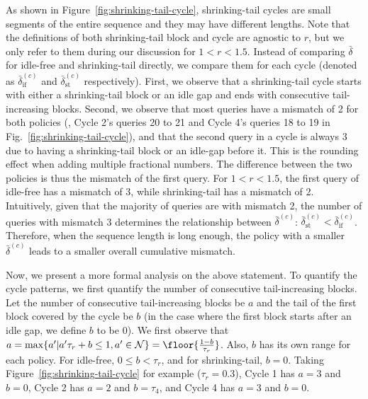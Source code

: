 As shown in Figure~\ref{fig:shrinking-tail-cycle}, shrinking-tail cycles are small segments of the entire sequence and they may have different lengths. Note that the definitions of both shrinking-tail block and cycle are agnostic to $r$, but we only refer to them during our discussion for $1 < r < 1.5$.
Instead of comparing $\bar{\delta}$ for idle-free and shrinking-tail directly,
we compare them for each cycle (denoted as $\bar{\delta}^{(c)}_{\text{if}}$ and $\bar{\delta}^{(c)}_{\text{st}}$ respectively). First, we observe that a shrinking-tail cycle starts with either a shrinking-tail block or an idle gap and ends with consecutive tail-increasing blocks. Second, we observe that most queries have a mismatch of 2 for both policies (\eg, Cycle 2's queries 20 to 21 and Cycle 4's queries 18 to 19 in Fig.~\ref{fig:shrinking-tail-cycle}), and that the second query in a cycle is always 3 due to having a shrinking-tail block or an idle-gap before it.  This is the rounding effect when adding multiple fractional numbers. The difference between the two policies is thus the mismatch of the first query. For $1 < r < 1.5$, the first query of idle-free has a mismatch of 3,
while shrinking-tail has a mismatch of 2. 
Intuitively, given that the majority of queries are with mismatch 2, the number of queries with mismatch 3 determines the relationship between $\bar{\delta}^{(c)}$: $\bar{\delta}^{(c)}_{\text{st}} < \bar{\delta}^{(c)}_{\text{if}}$. Therefore, when the sequence length is long enough, the policy with a smaller $\bar{\delta}^{(c)}$ leads to a smaller overall cumulative mismatch.

Now, we present a more formal analysis on the above statement. To quantify the cycle patterns, we first quantify the number of consecutive tail-increasing blocks. Let the number of consecutive tail-increasing blocks be $a$ and the tail of the first block covered by the cycle be $b$ (in the case where the first block starts after an idle gap, we define $b$ to be 0). We first observe that $a = \max \{a^\prime|a^\prime\tau_r + b \leq 1, a^\prime \in \mathcal{N}\} =\floor{\frac{1 - b}{\tau_r}}$. Also, $b$ has its own range for each policy. For idle-free, $0 \leq b < \tau_r$, and for shrinking-tail, $b = 0$. Taking Figure~\ref{fig:shrinking-tail-cycle} for example ($\tau_r = 0.3$), Cycle 1 has $a = 3$ and $b=0$, Cycle 2 has $a=2$ and $b=\tau_4$, and Cycle 4 has $a=3$ and $b=0$.

